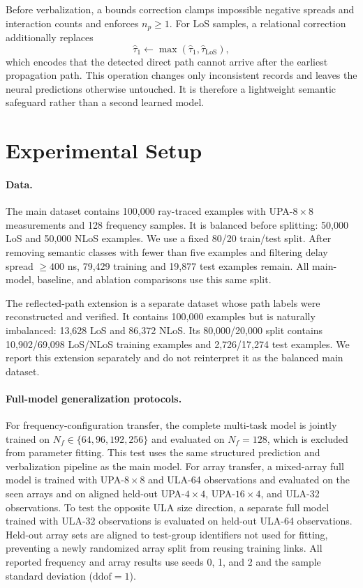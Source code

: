\documentclass{article}
\begin{document}
Before verbalization, a bounds correction clamps impossible negative spreads and interaction counts and enforces $n_p\ge1$.
For LoS samples, a relational correction additionally replaces
\begin{equation}
\hat{\tau}_1 \leftarrow \max(\hat{\tau}_1,\hat{\tau}_{\mathrm{LoS}}),
\end{equation}
which encodes that the detected direct path cannot arrive after the earliest propagation path.
This operation changes only inconsistent records and leaves the neural predictions otherwise untouched.
It is therefore a lightweight semantic safeguard rather than a second learned model.

\section{Experimental Setup}
\label{sec:setup}

\paragraph{Data.}
The main dataset contains 100,000 ray-traced examples with UPA-$8{\times}8$ measurements and 128 frequency samples.
It is balanced before splitting: 50,000 LoS and 50,000 NLoS examples.
We use a fixed 80/20 train/test split.
After removing semantic classes with fewer than five examples and filtering delay spread $\ge400$ ns, 79,429 training and 19,877 test examples remain.
All main-model, baseline, and ablation comparisons use this same split.

The reflected-path extension is a separate dataset whose path labels were reconstructed and verified.
It contains 100,000 examples but is naturally imbalanced: 13,628 LoS and 86,372 NLoS.
Its 80,000/20,000 split contains 10,902/69,098 LoS/NLoS training examples and 2,726/17,274 test examples.
We report this extension separately and do not reinterpret it as the balanced main dataset.

\paragraph{Full-model generalization protocols.}
For frequency-configuration transfer, the complete multi-task model is jointly trained on $N_f\in\{64,96,192,256\}$ and evaluated on $N_f=128$, which is excluded from parameter fitting.
This test uses the same structured prediction and verbalization pipeline as the main model.
For array transfer, a mixed-array full model is trained with UPA-$8{\times}8$ and ULA-64 observations and evaluated on the seen arrays and on aligned held-out UPA-$4{\times}4$, UPA-$16{\times}4$, and ULA-32 observations.
To test the opposite ULA size direction, a separate full model trained with ULA-32 observations is evaluated on held-out ULA-64 observations.
Held-out array sets are aligned to test-group identifiers not used for fitting, preventing a newly randomized array split from reusing training links.
All reported frequency and array results use seeds 0, 1, and 2 and the sample standard deviation ($\mathrm{ddof}=1$).
\end{document}
